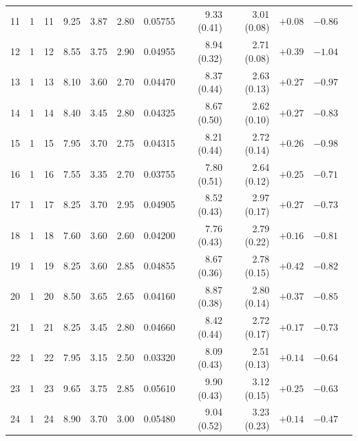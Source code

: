 \begin{longtable}{@{}rrrrrrrrrrrr@{}}
11 & 1 & 11 & \num{9.25} & \num{3.87} & \num{2.80} & \num{0.05755} & \num{9.33} (\num{0.41}) & \num{3.01} (\num{0.08}) & $+\num{0.08}$ & $-\num{0.86}$ &  \\
12 & 1 & 12 & \num{8.55} & \num{3.75} & \num{2.90} & \num{0.04955} & \num{8.94} (\num{0.32}) & \num{2.71} (\num{0.08}) & $+\num{0.39}$ & $-\num{1.04}$ &  \\
13 & 1 & 13 & \num{8.10} & \num{3.60} & \num{2.70} & \num{0.04470} & \num{8.37} (\num{0.44}) & \num{2.63} (\num{0.13}) & $+\num{0.27}$ & $-\num{0.97}$ &  \\
14 & 1 & 14 & \num{8.40} & \num{3.45} & \num{2.80} & \num{0.04325} & \num{8.67} (\num{0.50}) & \num{2.62} (\num{0.10}) & $+\num{0.27}$ & $-\num{0.83}$ &  \\
15 & 1 & 15 & \num{7.95} & \num{3.70} & \num{2.75} & \num{0.04315} & \num{8.21} (\num{0.44}) & \num{2.72} (\num{0.14}) & $+\num{0.26}$ & $-\num{0.98}$ &  \\
16 & 1 & 16 & \num{7.55} & \num{3.35} & \num{2.70} & \num{0.03755} & \num{7.80} (\num{0.51}) & \num{2.64} (\num{0.12}) & $+\num{0.25}$ & $-\num{0.71}$ &  \\
17 & 1 & 17 & \num{8.25} & \num{3.70} & \num{2.95} & \num{0.04905} & \num{8.52} (\num{0.43}) & \num{2.97} (\num{0.17}) & $+\num{0.27}$ & $-\num{0.73}$ &  \\
18 & 1 & 18 & \num{7.60} & \num{3.60} & \num{2.60} & \num{0.04200} & \num{7.76} (\num{0.43}) & \num{2.79} (\num{0.22}) & $+\num{0.16}$ & $-\num{0.81}$ &  \\
19 & 1 & 19 & \num{8.25} & \num{3.60} & \num{2.85} & \num{0.04855} & \num{8.67} (\num{0.36}) & \num{2.78} (\num{0.15}) & $+\num{0.42}$ & $-\num{0.82}$ &  \\
20 & 1 & 20 & \num{8.50} & \num{3.65} & \num{2.65} & \num{0.04160} & \num{8.87} (\num{0.38}) & \num{2.80} (\num{0.14}) & $+\num{0.37}$ & $-\num{0.85}$ &  \\
21 & 1 & 21 & \num{8.25} & \num{3.45} & \num{2.80} & \num{0.04660} & \num{8.42} (\num{0.44}) & \num{2.72} (\num{0.17}) & $+\num{0.17}$ & $-\num{0.73}$ &  \\
22 & 1 & 22 & \num{7.95} & \num{3.15} & \num{2.50} & \num{0.03320} & \num{8.09} (\num{0.43}) & \num{2.51} (\num{0.13}) & $+\num{0.14}$ & $-\num{0.64}$ &  \\
23 & 1 & 23 & \num{9.65} & \num{3.75} & \num{2.85} & \num{0.05610} & \num{9.90} (\num{0.43}) & \num{3.12} (\num{0.15}) & $+\num{0.25}$ & $-\num{0.63}$ &  \\
24 & 1 & 24 & \num{8.90} & \num{3.70} & \num{3.00} & \num{0.05480} & \num{9.04} (\num{0.52}) & \num{3.23} (\num{0.23}) & $+\num{0.14}$ & $-\num{0.47}$ &  \\

\end{longtable}

